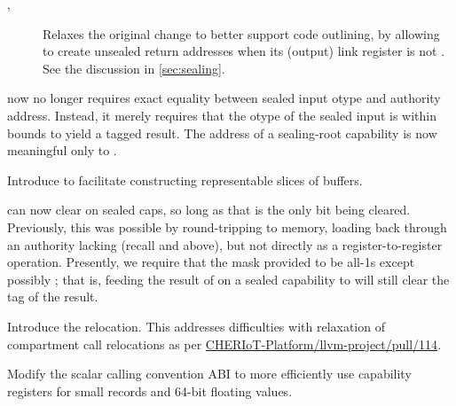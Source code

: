 \begin{description}
\begin{description}
      \begin{description}
        \item[, ] Relaxes the original change to better support code outlining,
          by allowing  to create unsealed return addresses
          when its (output) link register is not .
          See the discussion in \cref{sec:sealing}.
      \end{description}
    \item[\ghissue{71}, \ghpr{87}]  now no longer requires exact equality between sealed input otype and authority address.
      Instead, it merely requires that the otype of the sealed input is within bounds to yield a tagged result.
      The address of a sealing-root capability is now meaningful only to .
    \item[\ghissue{72},\ghpr{74}] Introduce  to facilitate constructing representable slices of buffers.
    \item[\ghissue{70},\ghpr{83}]  can now clear \cappermG on sealed caps, so long as that is the only bit being cleared.
      Previously, this was possible by round-tripping to memory, loading back through an authority lacking \cappermILG(recall  and  above), but not directly as a register-to-register operation.
      Presently, we require that the mask provided to  be all-1s except possibly \cappermG;
      that is, feeding the result of  on a sealed capability to  will still clear the tag of the result.
    \item[\ghpr{97}] Introduce the  relocation. This addresses difficulties with relaxation of compartment call relocations as per 
    \href{https://github.com/CHERIoT-Platform/llvm-project/pull/114}{CHERIoT-Platform/llvm-project/pull/114}.
    \item[\ghpr{104}, \ghpr{105}] Modify the scalar calling convention ABI to more efficiently use capability registers for small records and 64-bit floating values.
  \end{description}
\end{description}
